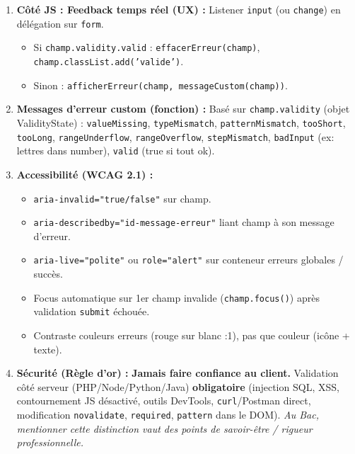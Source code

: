 \documentclass[11pt]{article}
\newcommand{\cle}[1]{{\popxbold\color{popdark}#1}}
\begin{document}
\begin{methode}
\begin{enumerate}
\begin{enumerate}
\begin{itemize}
                            \item Checksum, captcha, etc.
                        \end{itemize}
                  \item Si tout OK : \texttt{fetch()} (AJAX) ou \texttt{form.submit()} (envoi classique).
              \end{enumerate}
        \item \textbf{Côté JS : Feedback temps réel (UX) :} Listener \texttt{input} (ou \texttt{change}) en délégation sur \texttt{form}.
              \begin{itemize}
                  \item Si \texttt{champ.validity.valid} : \texttt{effacerErreur(champ)}, \texttt{champ.classList.add('valide')}.
                  \item Sinon : \texttt{afficherErreur(champ, messageCustom(champ))}.
              \end{itemize}
        \item \textbf{Messages d'erreur custom (fonction) :} Basé sur \texttt{champ.validity} (objet \cle{ValidityState}) :
              \texttt{valueMissing}, \texttt{typeMismatch}, \texttt{patternMismatch}, \texttt{tooShort}, \texttt{tooLong}, \texttt{rangeUnderflow}, \texttt{rangeOverflow}, \texttt{stepMismatch}, \texttt{badInput} (ex: lettres dans number), \texttt{valid} (true si tout ok).
        \item \textbf{Accessibilité (WCAG 2.1) :}
              \begin{itemize}
                  \item \texttt{aria-invalid="true/false"} sur champ.
                  \item \texttt{aria-describedby="id-message-erreur"} liant champ à son message d'erreur.
                  \item \texttt{aria-live="polite"} ou \texttt{role="alert"} sur conteneur erreurs globales / succès.
                  \item Focus automatique sur 1er champ invalide (\texttt{champ.focus()}) après validation \texttt{submit} échouée.
                  \item Contraste couleurs erreurs (rouge sur blanc :1), pas que couleur (icône + texte).
              \end{itemize}
        \item \textbf{Sécurité (Règle d'or) :} \textbf{Jamais faire confiance au client.} Validation côté serveur (PHP/Node/Python/Java) \textbf{obligatoire} (injection SQL, XSS, contournement JS désactivé, outils DevTools, \texttt{curl}/Postman direct, modification \texttt{novalidate}, \texttt{required}, \texttt{pattern} dans le DOM). \textit{Au Bac, mentionner cette distinction vaut des points de savoir-être / rigueur professionnelle.}
    \end{enumerate}
\end{methode}
\end{document}
